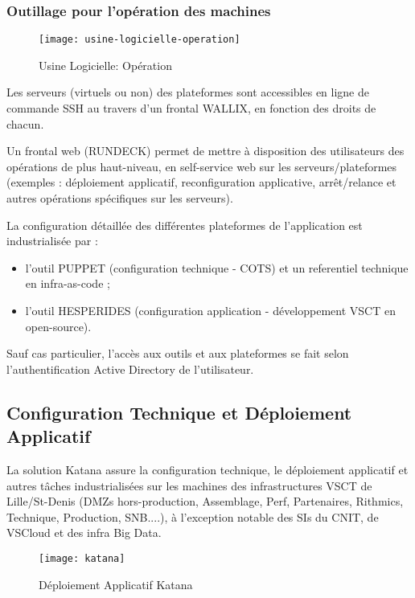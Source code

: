 \subsubsection{Outillage pour l'opération des machines}

\begin{figure}[ht]
 \centering
 \texttt{[image: usine-logicielle-operation]}
 \caption{Usine Logicielle: Opération}
\end{figure}

Les serveurs (virtuels ou non) des plateformes sont accessibles en ligne de commande SSH au travers d'un frontal WALLIX, en fonction des droits de chacun.

Un frontal web (RUNDECK) permet de mettre à disposition des utilisateurs des opérations de plus haut-niveau, en self-service web sur les serveurs/plateformes (exemples : déploiement applicatif, reconfiguration applicative, arrêt/relance et autres opérations spécifiques sur les serveurs).

La configuration détaillée des différentes plateformes de l'application est industrialisée par :
\begin{itemize}
 \item l'outil PUPPET (configuration technique - COTS) et un referentiel technique en infra-as-code ;
 \item l'outil HESPERIDES (configuration application - développement VSCT en open-source).
\end{itemize}

Sauf cas particulier, l'accès aux outils et aux plateformes se fait selon l'authentification Active Directory de l'utilisateur.

\subsection{Configuration Technique et Déploiement Applicatif}

La solution Katana assure la configuration technique, le déploiement applicatif et autres tâches industrialisées sur les machines des infrastructures VSCT de Lille/St-Denis (DMZs hors-production, Assemblage, Perf, Partenaires, Rithmics, Technique, Production, SNB....), à l'exception notable des SIs du CNIT, de VSCloud et des infra Big Data.

\begin{figure}[ht]
 \centering
 \texttt{[image: katana]}
 \caption{Déploiement Applicatif Katana}
\end{figure}

